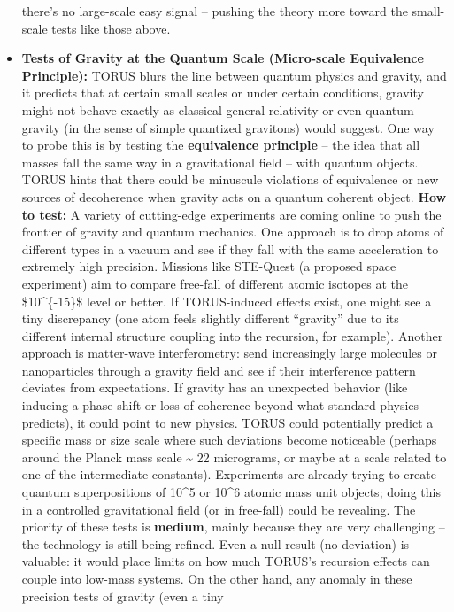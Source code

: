 \begin{itemize}
  there's no large-scale easy signal -- pushing the theory more toward
  the small-scale tests like those above.
\item
  \textbf{Tests of Gravity at the Quantum Scale (Micro-scale Equivalence
  Principle):} TORUS blurs the line between quantum physics and gravity,
  and it predicts that at certain small scales or under certain
  conditions, gravity might not behave exactly as classical general
  relativity or even quantum gravity (in the sense of simple quantized
  gravitons) would suggest. One way to probe this is by testing the
  \textbf{equivalence principle} -- the idea that all masses fall the
  same way in a gravitational field -- with quantum objects. TORUS hints
  that there could be minuscule violations of equivalence or new sources
  of decoherence when gravity acts on a quantum coherent object.
  \textbf{How to test:} A variety of cutting-edge experiments are coming
  online to push the frontier of gravity and quantum mechanics. One
  approach is to drop atoms of different types in a vacuum and see if
  they fall with the same acceleration to extremely high precision.
  Missions like STE-Quest (a proposed space experiment) aim to compare
  free-fall of different atomic isotopes at the \$10\^{}\{-15\}\$ level
  or better​. If TORUS-induced effects exist, one might see a tiny
  discrepancy (one atom feels slightly different ``gravity'' due to its
  different internal structure coupling into the recursion, for
  example). Another approach is matter-wave interferometry: send
  increasingly large molecules or nanoparticles through a gravity field
  and see if their interference pattern deviates from expectations. If
  gravity has an unexpected behavior (like inducing a phase shift or
  loss of coherence beyond what standard physics predicts), it could
  point to new physics. TORUS could potentially predict a specific mass
  or size scale where such deviations become noticeable (perhaps around
  the Planck mass scale \textasciitilde{} 22 micrograms, or maybe at a
  scale related to one of the intermediate constants). Experiments are
  already trying to create quantum superpositions of 10\^{}5 or 10\^{}6
  atomic mass unit objects; doing this in a controlled gravitational
  field (or in free-fall) could be revealing​. The priority of these
  tests is \textbf{medium}, mainly because they are very challenging --
  the technology is still being refined. Even a null result (no
  deviation) is valuable: it would place limits on how much TORUS's
  recursion effects can couple into low-mass systems​. On the other
  hand, any anomaly in these precision tests of gravity (even a tiny

\end{itemize}
